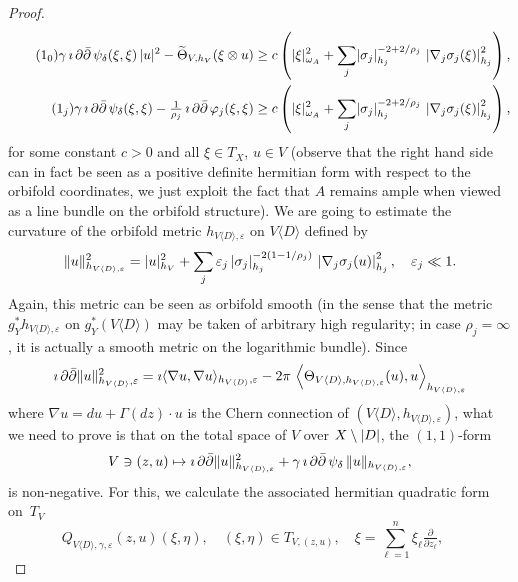 \documentclass[AHL,Unicode,longabstracts,published]{cedram}
\DeclareMathOperator{\ddbar}{\partial\bar\partial}
\DeclarePairedDelimiter{\abs}{\lvert}{\rvert}
\DeclarePairedDelimiter{\Abs}{\lVert}{\rVert}
\begin{document}
\begin{proof}
\begin{align}
\stepcounter{equation}
\tag{$\theequation_0$}
\gamma\,\imath\ddbar\psi_\delta(\xi,\xi)\,\abs{u}^2-\widetilde\Theta_{V,h_V}(\xi\otimes u) &\ge c\left(\abs{\xi}_{\omega_A}^2+\sum_j\abs{\sigma_j}_{h_j}^{-2+2/\rho_j}\,\left|\nabla_j\sigma_j(\xi)\right|_{h_j}^2
\right),
\\
\tag{$\theequation_j$}\label{6.3_j}
\gamma\,\imath\ddbar\psi_\delta(\xi,\xi)-\tfrac{1}{\rho_j}\,\imath\ddbar\varphi_j(\xi,\xi) &\ge c\left(\abs{\xi}_{\omega_A}^2+\sum_j\abs{\sigma_j}_{h_j}^{-2+2/\rho_j}\,\left|\nabla_j\sigma_j(\xi)\right|_{h_j}^2
\right),
\end{align}
for some constant $c>0$ and all $\xi\in T_X$, $u\in V$ (observe that the right hand side can in fact be seen as a positive definite hermitian form with respect to the orbifold coordinates, we just exploit the fact that
$A$ remains ample when viewed as a line bundle on the orbifold structure). We are going to estimate the curvature of the orbifold metric
$h_{V\langle D\rangle,\varepsilon}$ on $V\langle D\rangle$ defined by
\begin{equation}\label{eq:orbi_metric}
\Abs{u}_{h_{V\langle D\rangle,\varepsilon}}^2 =
\abs{u}_{h_V}^2+\sum_j\varepsilon_j\,
\abs{\sigma_j}_{h_j}^{-2(1-1/\rho_j)}\,\left|\nabla_j\sigma_j(u)\right|_{h_j}^2,
\quad \varepsilon_j\ll 1.
\end{equation}
Again, this metric can be seen as orbifold smooth (in the sense that the metric $g_Y^*h_{V\langle D\rangle,\varepsilon}$ on $g_Y^*(V\langle D\rangle)$ may be taken of arbitrary high regularity; in case $\rho_j=\infty$, it is actually a smooth metric on the logarithmic bundle). Since
\[
\imath\ddbar\Abs{u}_{h_{V\langle D\rangle},\varepsilon}^2=
\imath\langle\nabla u,\nabla u\rangle_{h_{V\langle D\rangle},\varepsilon}-2\pi\,
\left\langle\Theta_{V\langle D\rangle,h_{V\langle D\rangle,\varepsilon}}(u),u
\right\rangle_{h_{V\langle D\rangle,\varepsilon}}
\]
where $\nabla u=du+\Gamma(dz)\cdot u$ is the Chern connection of
$(V\langle D\rangle,h_{V\langle D\rangle,\varepsilon})$, what we need to prove is that on the total space of $V$ over $X\setminus\abs{D}$, the $(1,1)$-form
\[
V\ni (z,u)\mapsto
\imath\ddbar\Abs{u}_{h_{V\langle D\rangle,\varepsilon}}^2+\gamma\,
\imath\ddbar\psi_\delta\,\Abs{u}_{h_{V\langle D\rangle,\varepsilon}},
\]
is non-negative. For this, we calculate the associated hermitian quadratic form on~$T_V$
\[
Q_{V\langle D\rangle,\gamma,\varepsilon}(z,u)(\xi,\eta),\quad (\xi,\eta)\in T_{V,(z,u)},\quad
\xi=\sum_{\ell=1}^n\xi_\ell\tfrac{\partial}{\partial z_\ell},\quad
\]
\end{proof}
\end{document}
